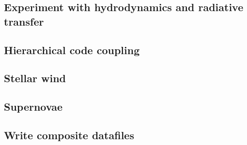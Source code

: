 \subsection{Experiment with hydrodynamics and radiative transfer}



\subsection{Hierarchical code coupling}


\subsection{Stellar wind}

\subsection{Supernovae}

\subsection{Write composite datafiles}



%
